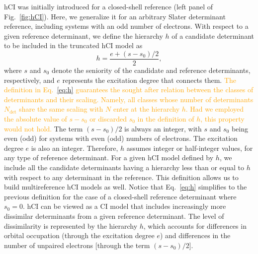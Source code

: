 \documentclass[aip,jcp,reprint,noshowkeys,superscriptaddress]{revtex4-1}
\newcommand{\fk}[1]{\textcolor{orange}{#1}}
\newcommand{\titou}[1]{\textcolor{red}{#1}}
\newcommand{\Ndet}{N_\text{det}}
\begin{document}
hCI was initially introduced for a closed-shell reference (left panel of Fig.~\ref{fig:hCI}). \cite{Kossoski_2022}
Here, we generalize it for an arbitrary Slater determinant reference, including systems with an odd number of electrons.
With respect to a given reference determinant, we define the hierarchy $h$ of a candidate determinant to be included in the truncated hCI model as
\begin{equation}
  \label{eq:h}
  h = \frac{e+ (s-s_0)/2}{2},
\end{equation}
where $s$ and $s_0$ denote the seniority of the candidate and reference determinants, respectively, and $e$ represents the excitation degree that connects them.
\fk{The definition in Eq.~\eqref{eq:h} guarantees the sought after relation between the classes of determinants and their scaling.
Namely, all classes whose number of determinants $\Ndet$ share the same scaling with $N$ enter at the hierarchy $h$.
Had we employed the absolute value of $s-s_0$ or discarded $s_0$ in the definition of $h$, this property would not hold.}
The term $(s-s_0)/2$ is always an integer, with $s$ and $s_0$ being even (odd) for systems with even (odd) numbers of electrons. The excitation degree $e$ is also an integer.
Therefore, $h$ assumes integer or half-integer values, for any type of reference determinant.
For a given hCI model defined by $h$, we include all the candidate determinants having a hierarchy less than or equal to $h$ with respect to any determinant in the reference.
This definition allows us to build multireference hCI models as well.
Notice that Eq.~\eqref{eq:h} simplifies to the previous definition \cite{Kossoski_2022} for the case of a closed-shell reference determinant where $s_0 = 0$.
hCI can be viewed as a CI model that includes increasingly more dissimilar determinants from a given reference determinant.
The level of dissimilarity is represented by the hierarchy $h$, which accounts for differences in orbital occupation (through the excitation degree $e$)
and differences in the number of unpaired electrons [through the term $(s-s_0)/2$].
\end{document}
